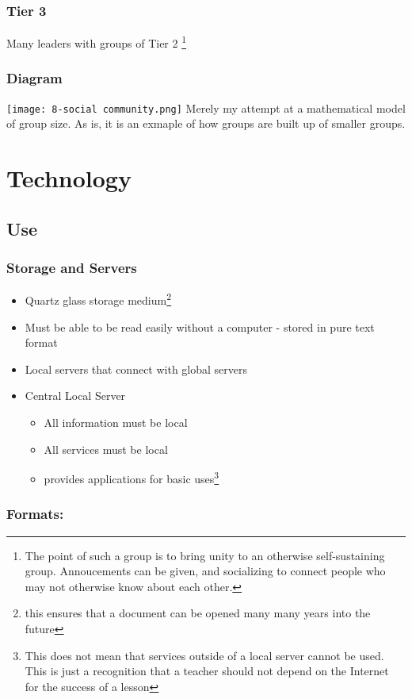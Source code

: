 \documentclass[CSHFoundation.tex]{subfiles}
\begin{document}
\subsubsection{Tier 3}

Many leaders with groups of Tier 2 \footnote{The point of such a group is to bring unity to an otherwise self-sustaining group. Annoucements can be given, and socializing to connect people who may not otherwise know about each other.}
\subsubsection{Diagram}
\texttt{[image: 8-social community.png]}
Merely my attempt at a mathematical model of group size. As is, it is an exmaple of how groups are built up of smaller groups.

\section{Technology}
\subsection{Use}
\subsubsection{Storage and Servers}

\begin{itemize}
\item Quartz glass storage medium\footnote{this ensures that a document can be opened many many years into the future}
\item Must be able to be read easily without a computer - stored in pure text format
\item Local servers that connect with global servers
\item Central Local Server
\begin{itemize}
	\item All information must be local
	\item All services must be local
	\item provides applications for basic uses\footnote{This does not mean that services outside of a local server cannot be used. This is just a recognition that a teacher should not depend on the Internet for the success of a lesson}
\end{itemize}\end{itemize}

\subsubsection{Formats:}
\end{document}

